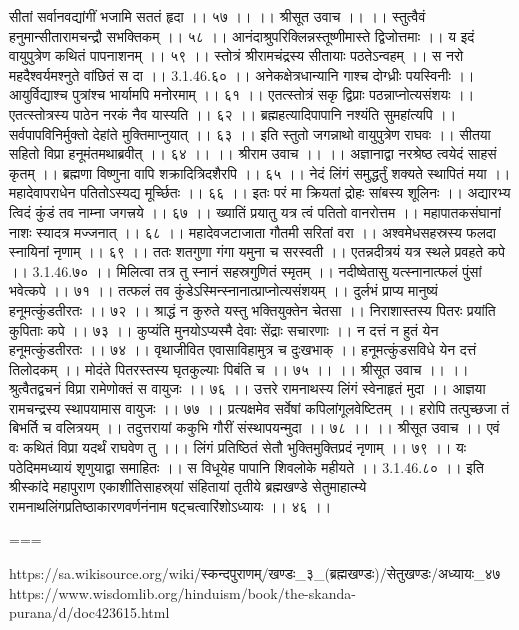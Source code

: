 सीतां सर्वानवद्यांगीं भजामि सततं हृदा ।। ५७ ।।
।। श्रीसूत उवाच ।। ।।
स्तुत्वैवं हनुमान्सीतारामचन्द्रौ सभक्तिकम् ।। ५८ ।।
आनंदाश्रुपरिक्लिन्नस्तूष्णीमास्ते द्विजोत्तमाः ।।
य इदं वायुपुत्रेण कथितं पापनाशनम् ।। ५९ ।।
स्तोत्रं श्रीरामचंद्रस्य सीतायाः पठतेऽन्वहम् ।।
स नरो महदैश्वर्यमश्नुते वांछितं स दा ।। 3.1.46.६० ।।
अनेकक्षेत्रधान्यानि गाश्च दोग्ध्रीः पयस्विनीः ।।
आयुर्विद्याश्च पुत्रांश्च भार्यामपि मनोरमाम् ।। ६१ ।।
एतत्स्तोत्रं सकृ द्विप्राः पठन्नाप्नोत्यसंशयः ।।
एतत्स्तोत्रस्य पाठेन नरकं नैव यास्यति ।। ६२ ।।
ब्रह्महत्यादिपापानि नश्यंति सुमहांत्यपि ।।
सर्वपापविनिर्मुक्तो देहांते मुक्तिमाप्नुयात् ।। ६३ ।।
इति स्तुतो जगन्नाथो वायुपुत्रेण राघवः ।।
सीतया सहितो विप्रा हनूमंतमथाब्रवीत् ।। ६४ ।।
।। श्रीराम उवाच ।। ।।
अज्ञानाद्वा नरश्रेष्ठ त्वयेदं साहसं कृतम् ।।
ब्रह्मणा विष्णुना वापि शक्रादित्रिदशैरपि ।। ६५ ।।
नेदं लिंगं समुद्धर्तुं शक्यते स्थापितं मया ।।
महादेवापराधेन पतितोऽस्यद्य मूर्च्छितः ।। ६६ ।।
इतः परं मा क्रियतां द्रोहः सांबस्य शूलिनः ।।
अद्यारभ्य त्विदं कुंडं तव नाम्ना जगत्त्रये ।। ६७ ।।
ख्यातिं प्रयातु यत्र त्वं पतितो वानरोत्तम ।।
महापातकसंघानां नाशः स्यादत्र मज्जनात् ।। ६८ ।।
महादेवजटाजाता गौतमी सरितां वरा ।।
अश्वमेधसहस्रस्य फलदा स्नायिनां नृणाम् ।। ६९ ।।
ततः शतगुणा गंगा यमुना च सरस्वती ।।
एतन्नदीत्रयं यत्र स्थले प्रवहते कपे ।। 3.1.46.७० ।।
मिलित्वा तत्र तु स्नानं सहस्रगुणितं स्मृतम् ।।
नदीष्वेतासु यत्स्नानात्फलं पुंसां भवेत्कपे ।। ७१ ।।
तत्फलं तव कुंडेऽस्मिन्स्नानात्प्राप्नोत्यसंशयम् ।।
दुर्लभं प्राप्य मानुष्यं हनूमत्कुंडतीरतः ।। ७२ ।।
श्राद्धं न कुरुते यस्तु भक्तियुक्तेन चेतसा ।।
निराशास्तस्य पितरः प्रयांति कुपिताः कपे ।। ७३ ।।
कुप्यंति मुनयोऽप्यस्मै देवाः सेंद्राः सचारणाः ।।
न दत्तं न हुतं येन हनूमत्कुंडतीरतः ।। ७४ ।।
वृथाजीवित एवासाविहामुत्र च दुःखभाक् ।।
हनूमत्कुंडसविधे येन दत्तं तिलोदकम् ।।
मोदंते पितरस्तस्य घृतकुल्याः पिबंति च ।। ७५ ।।
।। श्रीसूत उवाच ।। ।।
श्रुत्वैतद्वचनं विप्रा रामेणोक्तं स वायुजः ।। ७६ ।।
उत्तरे रामनाथस्य लिंगं स्वेनाहृतं मुदा ।।
आज्ञया रामचन्द्रस्य स्थापयामास वायुजः ।। ७७ ।।
प्रत्यक्षमेव सर्वेषां कपिलांगूलवेष्टितम् ।।
हरोपि तत्पुच्छजा तं बिभर्ति च वलित्रयम् ।।
तदुत्तरायां ककुभि गौरीं संस्थापयन्मुदा ।। ७८ ।।
।। श्रीसूत उवाच ।।
एवं वः कथितं विप्रा यदर्थं राघवेण तु ।।।
लिंगं प्रतिष्ठितं सेतौ भुक्तिमुक्तिप्रदं नृणाम् ।। ७९ ।।
यः पठेदिममध्यायं शृणुयाद्वा समाहितः ।।
स विधूयेह पापानि शिवलोके महीयते ।। 3.1.46.८० ।।
इति श्रीस्कांदे महापुराण एकाशीतिसाहस्र्यां संहितायां तृतीये ब्रह्मखण्डे सेतुमाहात्म्ये रामनाथलिंगप्रतिष्ठाकारणवर्णनंनाम षट्चत्वारिंशोऽध्यायः ।। ४६ ।।

===

https://sa.wikisource.org/wiki/स्कन्दपुराणम्/खण्डः_३_(ब्रह्मखण्डः)/सेतुखण्डः/अध्यायः_४७
https://www.wisdomlib.org/hinduism/book/the-skanda-purana/d/doc423615.html

